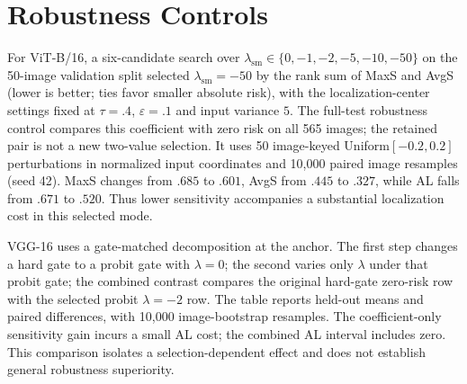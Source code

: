 \section{Robustness Controls}\label{app:rebuttal-robustness}

For ViT-B/16, a six-candidate search over $\lambda_{\mathrm{sm}}\in\{0,-1,-2,-5,-10,-50\}$ on the 50-image validation split selected $\lambda_{\mathrm{sm}}=-50$ by the rank sum of MaxS and AvgS (lower is better; ties favor smaller absolute risk), with the localization-center settings fixed at $\tau=.4$, $\varepsilon=.1$ and input variance $5$. The full-test robustness control compares this coefficient with zero risk on all 565 images; the retained pair is not a new two-value selection. It uses 50 image-keyed Uniform$[-0.2,0.2]$ perturbations in normalized input coordinates and 10,000 paired image resamples (seed 42). MaxS changes from $.685$ to $.601$, AvgS from $.445$ to $.327$, while AL falls from $.671$ to $.520$. Thus lower sensitivity accompanies a substantial localization cost in this selected mode.

VGG-16 uses a gate-matched decomposition at the anchor. The first step changes a hard gate to a probit gate with $\lambda=0$; the second varies only $\lambda$ under that probit gate; the combined contrast compares the original hard-gate zero-risk row with the selected probit $\lambda=-2$ row. The table reports held-out means and paired differences, with 10,000 image-bootstrap resamples. The coefficient-only sensitivity gain incurs a small AL cost; the combined AL interval includes zero. This comparison isolates a selection-dependent effect and does not establish general robustness superiority.

